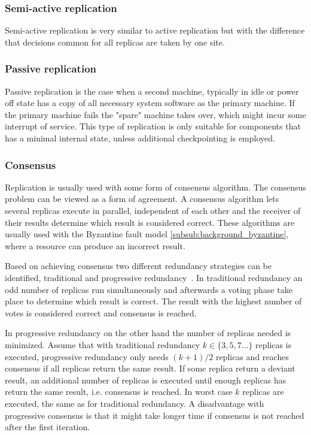 \documentclass{cslthse-msc}
\begin{document}
\subsubsection{Semi-active replication} \label{subsec:semi_active_replication}
Semi-active replication is very similar to active replication but with the difference that decisions common for all replicas are taken by one site.

\subsubsection{Passive replication} \label{subsec:passive_replication}
Passive replication is the case when a second machine, typically in idle or power off state has a copy of all necessary system software as the primary machine. If the primary machine fails the "spare" machine takes over, which might incur some interrupt of service. This type of replication is only suitable for components that has a minimal internal state, unless additional checkpointing is employed.

\subsubsection{Consensus} \label{subsub:consensus}
Replication is usually used with some form of consensus algorithm. The consensus problem can be viewed as a form of agreement. A consensus algorithm lets several replicas execute in parallel, independent of each other and the receiver of their results determine which result is considered correct. These algorithms are usually used with the Byzantine fault model \cref{subsub:background_byzantine}, where a resource can produce an incorrect result.

Based on achieving consensus two different redundancy strategies can be identified, traditional and progressive redundancy~\cite{selfAdaptRel}. In traditional redundancy an odd number of replicas run simultaneously and afterwards a voting phase take place to determine which result is correct. The result with the highest number of votes is considered correct and consensus is reached.

In progressive redundancy on the other hand the number of replicas needed is minimized. Assume that with traditional redundancy $k \in \{3,5,7...\}$ replicas is executed, progressive redundancy only needs $(k+1)/2$ replicas and reaches consensus if all replicas return the same result. If some replica return a deviant result, an additional number of replicas is executed until enough replicas has return the same result, i.e. consensus is reached. In worst case $k$ replicas are executed, the same as for traditional redundancy. A disadvantage with progressive consensus is that it might take longer time if consensus is not reached after the first iteration.
\end{document}
